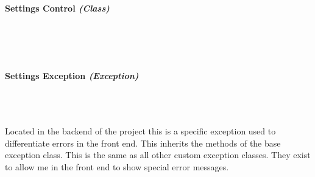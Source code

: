 \begin{FlushLeft}
    \bk

    \paragraph{Settings Control \textit{(Class)}} \mbox{} \\

    \begin{figure}[H]
        \centering
    \end{figure}\\

    \bk

    \paragraph{Settings Exception \textit{(Exception)}} \mbox{} \\

    \begin{figure}[H]
        \centering
    \end{figure}\\
    Located in the backend of the project this is a specific exception used to differentiate errors in the front end. This inherits the methods of the base exception class. This is the same as all other custom exception classes. They exist to allow me in the front end to show special error messages.
    \bk


\end{FlushLeft}
